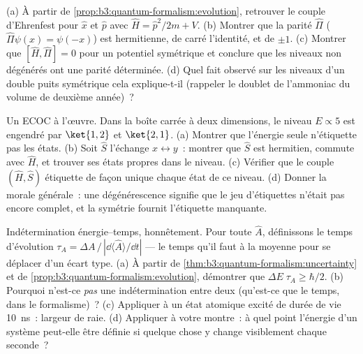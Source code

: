 \begin{exercise}[$\star\star$]\label{exo:b3:quantum-formalism:8}
(a) À partir de \cref{prop:b3:quantum-formalism:evolution}, retrouver
le couple d'Ehrenfest pour $\hat x$ et $\hat p$ avec $\hat H = \hat
p^2/2m + V$. (b) Montrer que la parité $\hat\Pi$ ($\hat\Pi\psi(x) =
\psi(-x)$) est hermitienne, de carré l'identité, et de 
$\pm1$. (c) Montrer que $[\hat H, \hat\Pi] = 0$ pour un potentiel
symétrique et conclure que les niveaux non dégénérés ont une parité
déterminée. (d) Quel fait observé sur les niveaux d'un double puits
symétrique cela explique-t-il (rappeler le doublet de l'ammoniac
du volume de deuxième année)~?
\end{exercise}

\begin{exercise}[$\star\star$]\label{exo:b3:quantum-formalism:9}
Un ECOC à l'œuvre. Dans la boîte carrée à deux dimensions, le niveau $E
\propto 5$ est engendré par $\ket{1,2}$ et $\ket{2,1}$. (a) Montrer que
l'énergie seule n'étiquette pas les états. (b) Soit $\hat S$ l'échange $x
\leftrightarrow y$~: montrer que $\hat S$ est hermitien, commute avec $\hat
H$, et trouver ses états propres dans le niveau. (c) Vérifier que le couple $(\hat H, \hat S)$ étiquette
de façon unique chaque état de ce niveau. (d) Donner la morale
générale~: une dégénérescence signifie que le jeu d'étiquettes n'était
pas encore complet, et la symétrie fournit l'étiquette manquante.
\end{exercise}

\begin{exercise}[$\star\star\star$]\label{exo:b3:quantum-formalism:10}
Indétermination énergie--temps, honnêtement. Pour toute 
$\hat A$, définissons le temps d'évolution $\tau_A = \Delta A\,/\,|\dd\langle\hat
A\rangle/\dd t|$ --- le temps qu'il faut à la moyenne pour se déplacer
d'un écart type. (a) À partir de
\cref{thm:b3:quantum-formalism:uncertainty} et de
\cref{prop:b3:quantum-formalism:evolution}, démontrer que $\Delta
E\;\tau_A \ge \hbar/2$. (b) Pourquoi n'est-ce \emph{pas} une
indétermination entre deux  (qu'est-ce que le temps, dans le
formalisme)~? (c) Appliquer à un état atomique excité de durée de vie
\qty{10}{ns}~: largeur de raie. (d) Appliquer à votre montre~: à quel
point l'énergie d'un système peut-elle être définie si quelque chose y
change visiblement chaque seconde~?
\end{exercise}

